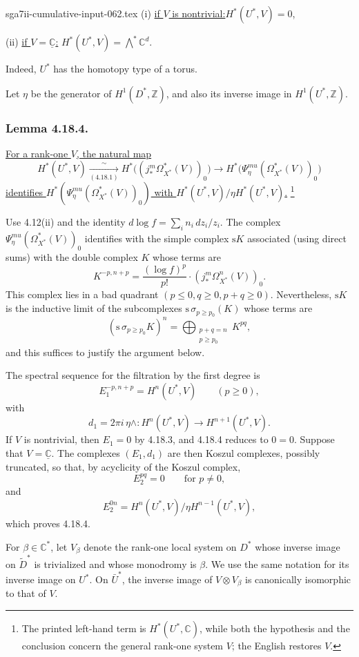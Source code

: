 \begin{filecontents*}{sga7ii-cumulative-input-062.tex}
\noindent\textup{(i)}\qquad
\uline{if $V$ is nontrivial:}\quad $H^*(U^*,V)=0$,

\medskip
\noindent\textup{(ii)}\qquad
\uline{if $V=\underline{\mathbb C}$:}\quad
$H^*(U^*,V)=\bigwedge\nolimits^*\mathbb C^d$.

Indeed, $U^*$ has the homotopy type of a torus.

Let $\eta$ be the generator of $H^1(D^*,\mathbb Z)$, and also its
inverse image in $H^1(U^*,\mathbb Z)$.

\subsubsection*{Lemma 4.18.4.}
\underline{For a rank-one $V$, the natural map}
\[
H^*(U^*,V)
 \xrightarrow[(4.18.1)]{\ \sim\ }
H^*\bigl((j_*^m\Omega_{X^*}^*(V))_0\bigr)
 \longrightarrow
H^*\bigl(\Psi_\eta^{mu}(\Omega_{X^*}^*(V))_0\bigr)
\]
\underline{identifies
$H^*(\Psi_\eta^{mu}(\Omega_{X^*}^*(V))_0)$ with
$H^*(U^*,V)/\eta H^*(U^*,V)$.}
\footnote{The printed left-hand term is $H^*(U^*,\mathbb C)$,
while both the hypothesis and the conclusion concern the general
rank-one system $V$; the English restores $V$.}

Use 4.12(ii) and the identity
$d\log f=\sum_i n_i\,dz_i/z_i$.  The complex
$\Psi_\eta^{mu}(\Omega_{X^*}^*(V))_0$ identifies with the simple
complex $\mathrm{s}K$ associated (using direct sums) with the double
complex $K$ whose terms are
\[
K^{-p,n+p}=\frac{(\log f)^p}{p!}\cdot
  (j_*^m\Omega_{X^*}^n(V))_0.
\]
This complex lies in a bad quadrant
$(p\leq0,q\geq0,p+q\geq0)$.  Nevertheless, $\mathrm{s}K$ is the
inductive limit of the subcomplexes
$\mathrm{s}\,\sigma_{p\geq p_0}(K)$ whose terms are
\[
(\mathrm{s}\,\sigma_{p\geq p_0}K)^n
=\bigoplus_{\substack{p+q=n\\p\geq p_0}}K^{pq},
\]
and this suffices to justify the argument below.

The spectral sequence for the filtration by the first degree is
\[
E_1^{-p,n+p}=H^n(U^*,V)\qquad(p\geq0),
\]
with
\[
d_1=2\pi i\,\eta\wedge:
H^n(U^*,V)\longrightarrow H^{n+1}(U^*,V).
\]
If $V$ is nontrivial, then $E_1=0$ by 4.18.3, and 4.18.4 reduces
to $0=0$.  Suppose that $V=\underline{\mathbb C}$.  The complexes
$(E_1,d_1)$ are then Koszul complexes, possibly truncated, so that,
by acyclicity of the Koszul complex,
\[
E_2^{pq}=0\qquad\text{for }p\ne0,
\]
and
\[
E_2^{0n}=H^n(U^*,V)/\eta H^{n-1}(U^*,V),
\]
which proves 4.18.4.

For $\beta\in\mathbb C^*$, let $V_\beta$ denote the rank-one local
system on $D^*$ whose inverse image on $\widetilde D^*$ is
trivialized and whose monodromy is $\beta$.  We use the same notation
for its inverse image on $U^*$.  On $\bar U^*$, the inverse image of
$V\otimes V_\beta$ is canonically isomorphic to that of $V$.


\end{filecontents*}
